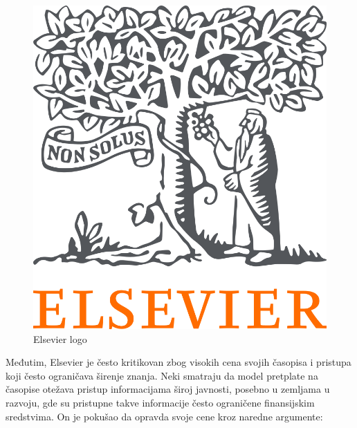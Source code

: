 \documentclass{article}
\begin{document}
\begin{figure}[htbp]
    \center
    \includegraphics[scale=0.15]{img/elsevier-logo.png}
    \caption{Elsevier logo}
\end{figure}

Međutim, Elsevier je često kritikovan zbog visokih cena svojih časopisa i pristupa koji često ograničava širenje znanja. Neki smatraju da model pretplate na časopise otežava pristup informacijama široj javnosti, posebno u zemljama u razvoju, gde su pristupne takve informacije često ograničene finansijskim sredstvima. On je pokušao da opravda svoje cene kroz naredne argumente:
\end{document}
